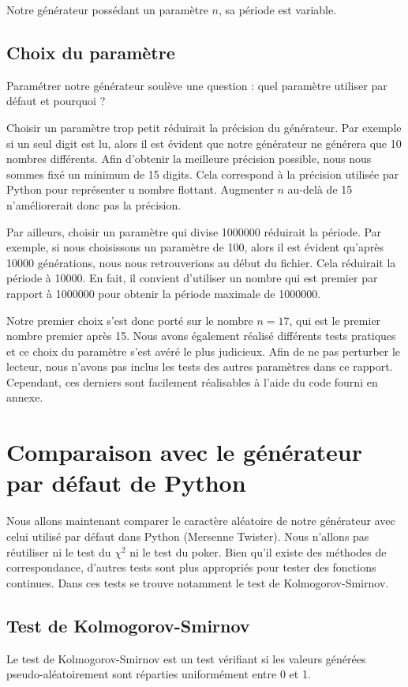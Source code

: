 \documentclass[10pt,a4paper]{article}
\begin{document}
	Notre générateur possédant un paramètre $n$, sa période est variable.
	
	\subsection{Choix du paramètre}
	Paramétrer notre générateur soulève une question : quel paramètre utiliser par défaut et pourquoi ?
	
	Choisir un paramètre trop petit réduirait la précision du générateur.
	Par exemple si un seul digit est lu, alors il est évident que notre générateur ne générera que 10 nombres différents.
	Afin d'obtenir la meilleure précision possible, nous nous sommes fixé un minimum de 15 digits.
	Cela correspond à la précision utilisée par Python pour représenter u nombre flottant.
	Augmenter $n$ au-delà de 15 n'améliorerait donc pas la précision.
	
	Par ailleurs, choisir un paramètre qui divise 1000000 réduirait la période.
	Par exemple, si nous choisissons un paramètre de 100, alors il est évident qu'après 10000 générations, nous nous retrouverions au début du fichier.
	Cela réduirait la période à 10000.
	En fait, il convient d'utiliser un nombre qui est premier par rapport à 1000000 pour obtenir la période maximale de 1000000.
	
	Notre premier choix s'est donc porté sur le nombre $n = 17$, qui est le premier nombre premier après 15.
	Nous avons également réalisé différents tests pratiques et ce choix du paramètre s'est avéré le plus judicieux.
	Afin de ne pas perturber le lecteur, nous n'avons pas inclus les tests des autres paramètres dans ce rapport.
	Cependant, ces derniers sont facilement réalisables à l'aide du code fourni en annexe.
	
	\newpage
	\section{Comparaison avec le générateur par défaut de Python}
	Nous allons maintenant comparer le caractère aléatoire de notre générateur avec celui utilisé par défaut dans Python (Mersenne Twister).
	Nous n'allons pas réutiliser ni le test du $\chi^2$ ni le test du poker.
	Bien qu'il existe des méthodes de correspondance, d'autres tests sont plus appropriés pour tester des fonctions continues.
	Dans ces tests se trouve notamment le test de Kolmogorov-Smirnov.
	

	\subsection{Test de Kolmogorov-Smirnov}
	Le test de Kolmogorov-Smirnov est un test vérifiant si les valeurs générées pseudo-aléatoirement sont réparties uniformément entre 0 et 1.
	
\end{document}
